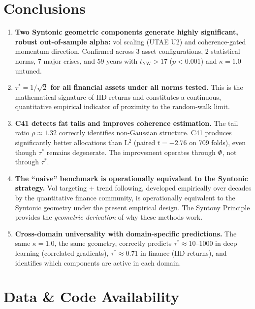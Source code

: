 \documentclass[11pt,a4paper]{article}
\begin{document}
\section{Conclusions}

\begin{enumerate}
\item \textbf{Two Syntonic geometric components generate highly significant, robust out-of-sample alpha:} vol scaling (UTAE U2) and coherence-gated momentum direction. Confirmed across 3 asset configurations, 2 statistical norms, 7 major crises, and 59 years with $t_{\text{NW}} > 17$ ($p < 0.001$) and $\kappa = 1.0$ untuned.

\item \textbf{$\tau^* = 1/\sqrt{2}$ for all financial assets under all norms tested.} This is the mathematical signature of IID returns and constitutes a continuous, quantitative empirical indicator of proximity to the random-walk limit.

\item \textbf{C41 detects fat tails and improves coherence estimation.} The tail ratio $\rho \approx 1.32$ correctly identifies non-Gaussian structure. C41 produces significantly better allocations than L$^2$ (paired $t = -2.76$ on 709 folds), even though $\tau^*$ remains degenerate. The improvement operates through $\Phi$, not through $\tau^*$.

\item \textbf{The ``naive'' benchmark is operationally equivalent to the Syntonic strategy.} Vol targeting + trend following, developed empirically over decades by the quantitative finance community, is operationally equivalent to the Syntonic geometry under the present empirical design. The Syntony Principle provides the \emph{geometric derivation} of why these methods work.

\item \textbf{Cross-domain universality with domain-specific predictions.} The same $\kappa = 1.0$, the same geometry, correctly predicts $\tau^* \approx 10$--$1000$ in deep learning (correlated gradients), $\tau^* \approx 0.71$ in finance (IID returns), and identifies which components are active in each domain.
\end{enumerate}

\section*{Data \& Code Availability}
\end{document}

